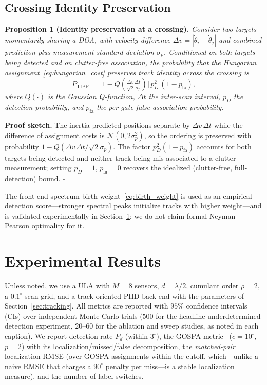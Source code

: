 \documentclass[journal]{IEEEtran}
\begin{document}
\subsection{Crossing Identity Preservation}
\label{sec:tipp}

\textbf{Proposition 1 (Identity preservation at a crossing).}
\emph{Consider two targets momentarily sharing a DOA, with velocity difference $\Delta v = |\dot{\theta}_i - \dot{\theta}_j|$ and combined prediction-plus-measurement standard deviation $\sigma_p$. Conditioned on both targets being detected and on clutter-free association, the probability that the Hungarian assignment~\eqref{eq:hungarian_cost} preserves track identity across the crossing is}
\begin{equation}
P_{\mathrm{TIPP}} = \big[\,1 - Q\!\left(\tfrac{\Delta v\,\Delta t}{\sqrt{2}\,\sigma_p}\right)\big]\,p_D^2\,(1 - p_{\mathrm{fa}}),
\label{eq:tipp}
\end{equation}
\emph{where $Q(\cdot)$ is the Gaussian Q-function, $\Delta t$ the inter-scan interval, $p_D$ the detection probability, and $p_{\mathrm{fa}}$ the per-gate false-association probability.}

\textbf{Proof sketch.}
The inertia-predicted positions separate by $\Delta v\,\Delta t$ while the difference of assignment costs is $\mathcal{N}(0, 2\sigma_p^2)$, so the ordering is preserved with probability $1 - Q(\Delta v\,\Delta t/\sqrt{2}\sigma_p)$. The factor $p_D^2(1 - p_{\mathrm{fa}})$ accounts for both targets being detected and neither track being mis-associated to a clutter measurement; setting $p_D = 1$, $p_{\mathrm{fa}} = 0$ recovers the idealized (clutter-free, full-detection) bound. \hfill$\square$

The front-end-spectrum birth weight~\eqref{eq:birth_weight} is used as an empirical detection score---stronger spectral peaks initialize tracks with higher weight---and is validated experimentally in Section~\ref{sec:experiments}; we do not claim formal Neyman--Pearson optimality for it.

\section{Experimental Results}
\label{sec:experiments}

Unless noted, we use a ULA with $M=8$ sensors, $d=\lambda/2$, cumulant order
$\rho=2$, a $0.1^\circ$ scan grid, and a track-oriented PHD back-end with the
parameters of Section~\ref{sec:tracking}. All metrics are reported with $95\%$
confidence intervals (CIs) over independent Monte-Carlo trials ($500$ for the
headline underdetermined-detection experiment, $20$--$60$ for the ablation and
sweep studies, as noted in each caption). We report detection rate $P_d$ (within $3^\circ$), the GOSPA
metric~\cite{rahmathullah2017gospa} ($c=10^\circ$, $p=2$) with its
localization/missed/false decomposition, the \emph{matched-pair} localization
RMSE (over GOSPA assignments within the cutoff, which---unlike a naive RMSE that
charges a $90^\circ$ penalty per miss---is a stable localization measure), and
the number of label switches.
\end{document}
